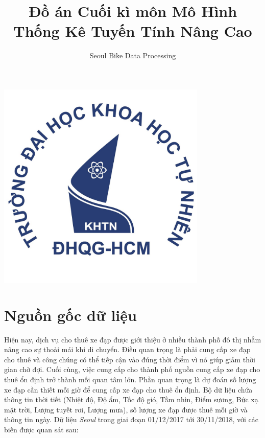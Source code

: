 \documentclass[
  11pt,
  letterpaper,
]{article}
\title{Đồ án Cuối kì môn Mô Hình Thống Kê Tuyến Tính Nâng Cao}
\subtitle{Seoul Bike Data Processing}
\author{}
\date{\vspace{-2.5em}}
\begin{document}
\maketitle

\centering

\includegraphics[width=10cm]{logo.jpg}

\raggedright
\clearpage
\tableofcontents

\clearpage

\section{Nguồn gốc dữ liệu}

Hiện nay, dịch vụ cho thuê xe đạp được giới thiệu ở nhiều thành phố đô thị nhằm nâng cao sự thoải mái khi di chuyển. Điều quan trọng là phải cung cấp xe đạp cho thuê và công chúng có thể tiếp cận vào đúng thời điểm vì nó giúp giảm thời gian chờ đợi. Cuối cùng, việc cung cấp cho thành phố nguồn cung cấp xe đạp cho thuê ổn định trở thành mối quan tâm lớn. Phần quan trọng là dự đoán số lượng xe đạp cần thiết mỗi giờ để cung cấp xe đạp cho thuê ổn định. Bộ dữ liệu chứa thông tin thời tiết (Nhiệt độ, Độ ẩm, Tốc độ gió, Tầm nhìn, Điểm sương, Bức xạ mặt trời, Lượng tuyết rơi, Lượng mưa), số lượng xe đạp được thuê mỗi giờ và thông tin ngày. Dữ liệu \emph{Seoul} trong giai đoạn 01/12/2017 tới 30/11/2018, với các biến được quan sát sau:
\end{document}
